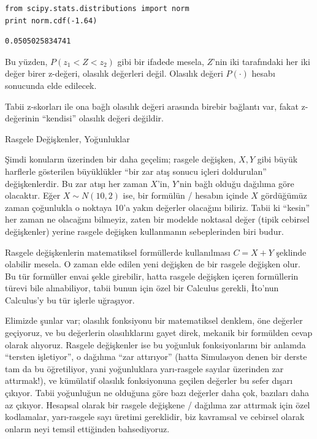 \documentclass[12pt,fleqn]{article}\usepackage{../../common}
\begin{document}
\begin{verbatim}
from scipy.stats.distributions import norm
print norm.cdf(-1.64)
\end{verbatim}

\begin{verbatim}
0.0505025834741
\end{verbatim}

Bu yüzden, $P(z_1 < Z < z_2)$ gibi bir ifadede mesela, $Z$'nin iki
tarafındaki her iki değer birer z-değeri, olasılık değerleri
değil. Olasılık değeri $P(\cdot)$ hesabı sonucunda elde edilecek. 

Tabii z-skorları ile ona bağlı olasılık değeri arasında birebir bağlantı
var, fakat z-değerinin ``kendisi'' olasılık değeri değildir.

Rasgele Değişkenler, Yoğunluklar

Şimdi konuların üzerinden bir daha geçelim; rasgele değişken, $X,Y$ gibi
büyük harflerle gösterilen büyüklükler ``bir zar atış sonucu içleri
doldurulan'' değişkenlerdir. Bu zar atışı her zaman $X$'in, $Y$'nin bağlı
olduğu dağılıma göre olacaktır. Eğer $X \sim N(10,2)$ ise, bir formülün /
hesabın içinde $X$ gördüğümüz zaman çoğunlukla o noktaya 10'a yakın
değerler olacağını biliriz. Tabii ki ``kesin'' her zaman ne olacağını
bilmeyiz, zaten bir modelde noktasal değer (tipik cebirsel değişkenler)
yerine rasgele değişken kullanmanın sebeplerinden biri budur.

Rasgele değişkenlerin matematiksel formüllerde kullanılması $C = X + Y$
şeklinde olabilir mesela. O zaman elde edilen yeni değişken de bir rasgele
değişken olur. Bu tür formüller envai şekle girebilir, hatta rasgele
değişken içeren formüllerin türevi bile alınabiliyor, tabii bunun için özel
bir Calculus gerekli, İto'nun Calculus'y bu tür işlerle uğraşıyor.

Elimizde şunlar var; olasılık fonksiyonu bir matematiksel denklem, öne
değerler geçiyoruz, ve bu değerlerin olasılıklarını gayet direk, mekanik
bir formülden cevap olarak alıyoruz. Rasgele değişkenler ise bu yoğunluk
fonksiyonlarını bir anlamda ``tersten işletiyor'', o dağılıma ``zar
attırıyor'' (hatta Simulasyon denen bir derste tam da bu öğretiliyor, yani
yoğunluklara yarı-rasgele sayılar üzerinden zar attırmak!), ve kümülatif
olasılık fonksiyonuna geçilen değerler bu sefer dışarı çıkıyor. Tabii
yoğunluğun ne olduğuna göre bazı değerler daha çok, bazıları daha az
çıkıyor. Hesapsal olarak bir rasgele değişkene / dağılıma zar attırmak için
özel kodlamalar, yarı-rasgele sayı üretimi gereklidir, biz kavramsal ve
cebirsel olarak onların neyi temsil ettiğinden bahsediyoruz.
\end{document}
